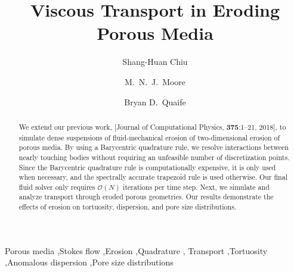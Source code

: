 \documentclass[preprint,10pt]{elsarticle}
\begin{document}
\title{Viscous Transport in Eroding Porous Media}



\author[SH]{Shang-Huan Chiu}
\author[Nick]{M.~N.~J.~Moore}
\author[Bryan]{Bryan D.~Quaife}

\address[SH]{Department of Scientific Computing, Florida State
University, Tallahassee, FL, 32306.}
\address[Nick]{Department of Mathematics and Geophysical Fluid Dynamics
Institute, Florida State University, Tallahassee, FL, 32306.}
\address[Bryan]{Department of Scientific Computing and Geophysical Fluid
Dynamics Institute, Florida State University, Tallahassee, FL, 32306.}

\begin{abstract} 
  We extend our previous work, [Journal of Computational Physics, {\bf
  375}:1--21, 2018], to simulate dense suspensions of fluid-mechanical
  erosion of two-dimensional erosion of porous media. By using a
  Barycentric quadrature rule, we resolve interactions
  between nearly touching bodies without requiring an unfeasible number
  of discretization points.  Since the Barycentric quadrature rule is
  computationally expensive, it is only used when necessary, and the
  spectrally accurate trapezoid rule is used otherwise. Our final fluid
  solver only requires $\mathcal{O}(N)$ iterations per time step. Next,
  we simulate and analyze transport through eroded porous geometries.
  Our results demonstrate the effects of erosion on tortuosity,
  dispersion, and pore size distributions.
\end{abstract}

\begin{keyword}
  Porous media \sep Stokes flow \sep Erosion \sep Quadrature \sep
  Transport \sep Tortuosity \sep Anomalous dispersion \sep Pore size
  distributions
\end{keyword}

\maketitle

\end{document}
